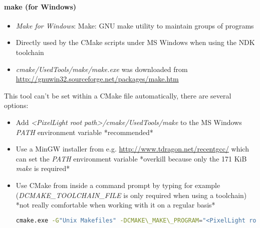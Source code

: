 \paragraph{make (for Windows)}
\begin{itemize}
\item{\emph{Make for Windows}: Make: GNU make utility to maintain groups of programs}
\item{Directly used by the CMake scripts under \ac{MS} Windows when using the \ac{NDK} toolchain}
\item{\emph{cmake/UsedTools/make/make.exe} was downloaded from \url{http://gnuwin32.sourceforge.net/packages/make.htm}}
\end{itemize}
This tool can't be set within a CMake file automatically, there are several options:
\begin{itemize}
\item{Add \emph{\textless PixelLight root path\textgreater /cmake/UsedTools/make} to the \ac{MS} Windows \emph{PATH} environment variable *recommended*}
\item{Use a MinGW installer from e.g. \url{http://www.tdragon.net/recentgcc/} which can set the \emph{PATH} environment variable *overkill because only the 171 KiB \emph{make} is required*}
\item{Use CMake from inside a command prompt by typing for example (\emph{DCMAKE\_TOOLCHAIN\_FILE} is only required when using a toolchain) \\ *not really comfortable when working with it on a regular basis*
\begin{lstlisting}[language=sh]
cmake.exe -G"Unix Makefiles" -DCMAKE\_MAKE\_PROGRAM="<PixelLight root path>/cmake/UsedTools/make/make.exe" -DCMAKE\_TOOLCHAIN\_FILE="<PixelLight root path>/cmake/Toolchains7Toolchain-ndk.cmake"
\end{lstlisting}
}
\end{itemize}




